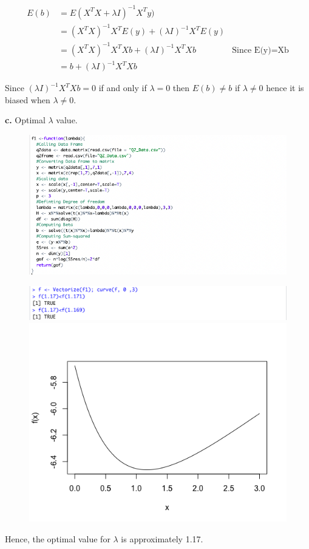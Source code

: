 \documentclass[12 pt, a4paper]{article}
\begin{document}
\begin{align*}
E(b)&=E(X^TX+\lambda I)^{-1}X^Ty) \\
&=(X^TX)^{-1}X^TE(y)+(\lambda I)^{-1}X^TE(y)\\
&=(X^TX)^{-1}X^TXb+(\lambda I)^{-1}X^TXb  & \text{Since E(y)=Xb}\\
&=b+(\lambda I)^{-1}X^TXb 
\end{align*} 

\noindent Since $(\lambda I)^{-1} X^TXb=0$ if and only if $\lambda = 0$ then $E(b) \neq b$ if $\lambda \neq 0$ hence it is biased when $\lambda \neq 0$.

\pagebreak
\noindent \textbf{c.} Optimal $\lambda$ value.

\begin{figure}[h]
\includegraphics[scale=0.5]{q5}
\end{figure}

\begin{figure}[h]
\includegraphics[scale=0.5]{graph4}
\includegraphics[scale=0.5]{graph3}
\end{figure}

Hence,  the optimal value for $\lambda$ is approximately 1.17.
\end{document}
